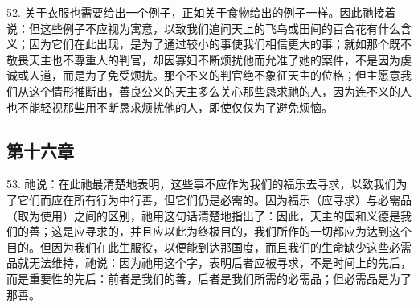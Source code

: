 52. 关于衣服也需要给出一个例子，正如关于食物给出的例子一样。因此祂接着说：但这些例子不应视为寓意，以致我们追问天上的飞鸟或田间的百合花有什么含义；因为它们在此出现，是为了通过较小的事使我们相信更大的事；就如那个既不敬畏天主也不尊重人的判官，却因寡妇不断烦扰他而允准了她的案件，不是因为虔诚或人道，而是为了免受烦扰。那个不义的判官绝不象征天主的位格；但主愿意我们从这个情形推断出，善良公义的天主多么关心那些恳求祂的人，因为连不义的人也不能轻视那些用不断恳求烦扰他的人，即使仅仅为了避免烦恼。\par


\subsection{第十六章}

53. 祂说：在此祂最清楚地表明，这些事不应作为我们的福乐去寻求，以致我们为了它们而应在所有行为中行善，但它们仍是必需的。因为福乐（应寻求）与必需品（取为使用）之间的区别，祂用这句话清楚地指出了：因此，天主的国和义德是我们的善；这是应寻求的，并且应以此为终极目的，我们所作的一切都应为达到这个目的。但因为我们在此生服役，以便能到达那国度，而且我们的生命缺少这些必需品就无法维持，祂说：因为祂用这个字，表明后者应被寻求，不是时间上的先后，而是重要性的先后：前者是我们的善，后者是我们所需的必需品；但必需品是为了那善。\par

